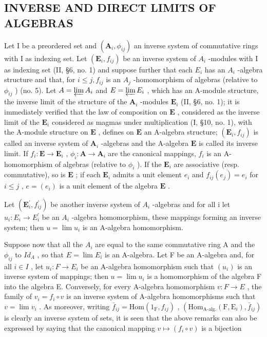 \subsection{INVERSE AND DIRECT LIMITS OF ALGEBRAS}

Let I be a preordered set and \((\mathbf{A}_{i},\phi_{ij})\) an inverse system of commutative rings with I as indexing set. Let \((\mathbf{E}_{i},f_{ij})\) be an inverse system of \(A_{i}\) -modules with I as indexing set (II, §6, no. 1) and suppose further that each \(E_{i}\) has an \(A_{i}\) -algebra structure and that, for \(i\leqslant j,f_{ij}\) is an \(A_{j}\) -homomorphism of algebras (relative to \(\phi_{ij}\) ) (no. 5). Let \(A=\varprojlim A_{i}\) and \(E=\varprojlim E_{i}\) , which has an A-module structure, the inverse limit of the structure of the \(\mathbf{A}_i\) -modules \(\mathbf{E}_i\) (II, §6, no. 1); it is immediately verified that the law of composition on \(\mathbf{E}\) , considered as the inverse limit of the \(\mathbf{E}_i\) considered as magmas under multiplication (I, §10, no. 1), with the A-module structure on \(\mathbf{E}\) , defines on \(\mathbf{E}\) an A-algebra structure; \((\mathbf{E}_i, f_{ij})\) is called an inverse system of \(\mathbf{A}_i\) -algebras and the A-algebra \(\mathbf{E}\) is called its inverse limit. If \(f_i: \mathbf{E} \to \mathbf{E}_i\) , \(\phi_i: \mathbf{A} \to \mathbf{A}_i\) are the canonical mappings, \(f_i\) is an A-homomorphism of algebras (relative to \(\phi_i\) ). If the \(\mathbf{E}_i\) are associative (resp. commutative), so is \(\mathbf{E}\) ; if each \(\mathbf{E}_i\) admits a unit element \(e_i\) and \(f_{ij}(e_j) = e_i\) for \(i \leqslant j\) , \(e = (e_i)\) is a unit element of the algebra \(\mathbf{E}\) .

Let \((\mathbf{E}_{i}^{\prime}, f_{ij}^{\prime})\) be another inverse system of \(A_{i}\) -algebras and for all i let \(u_{i}: E_{i} \to E_{i}^{\prime}\) be an \(A_{i}\) -algebra homomorphism, these mappings forming an inverse system; then \(u = \lim u_{i}\) is an A-algebra homomorphism.

Suppose now that all the \(A_{i}\) are equal to the same commutative ring A and the \(\phi_{ij}\) to \(Id_{A}\) , so that \(E = \lim E_{i}\) is an A-algebra. Let F be an A-algebra and, for all \(i \in I\) , let \(u_{i}: F \to E_{i}\) be an A-algebra homomorphism such that \((u_{i})\) is an inverse system of mappings; then \(u = \lim u_{i}\) is a homomorphism of the algebra F into the algebra E. Conversely, for every A-algebra homomorphism \(v: F \to E\) , the family of \(v_{i} = f_{i} \circ v\) is an inverse system of A-algebra homomorphisms such that \(v = \lim v_{i}\) . As moreover, writing \(\bar{f}_{ij} = \text{Hom}(1_{\text{F}}, f_{ij})\) , \((\text{Hom}_{\text{A-alg.}}(\text{F}, \text{E}_i), \bar{f}_{ij})\) is clearly an inverse system of sets, it is seen that the above remarks can also be expressed by saying that the canonical mapping \(v \mapsto (f_i \circ v)\) is a bijection

